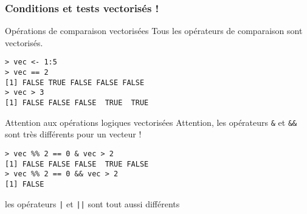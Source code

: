 \documentclass[10pt]{beamer}
\begin{document}
\begin{frame}[fragile]
  \frametitle{Conditions et tests vectorisés !}
  \begin{block}{Opérations de comparaison vectorisées}
    Tous les opérateurs de comparaison sont vectorisés.
  \begin{lstlisting}
> vec <- 1:5
> vec == 2
[1] FALSE TRUE FALSE FALSE FALSE
> vec > 3
[1] FALSE FALSE FALSE  TRUE  TRUE
\end{lstlisting}
\end{block}

\begin{alertblock}{Attention aux opérations logiques vectorisées}
  Attention, les opérateurs \texttt{\&} et \texttt{\&\&} sont très différents pour un vecteur !
 \begin{lstlisting}
> vec %% 2 == 0 & vec > 2
[1] FALSE FALSE FALSE  TRUE FALSE
> vec %% 2 == 0 && vec > 2
[1] FALSE
\end{lstlisting}

les opérateurs \texttt{|} et \texttt{||} sont tout aussi différents
\end{alertblock}
\end{frame}
\end{document}
